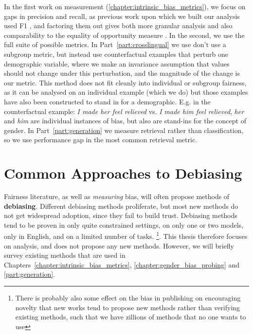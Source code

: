 In the first work on measurement (\ref{chapter:intrinsic_bias_metrics}), we focus on gaps in precision and recall, as previous work upon which we built our analysis used F1 \citep{zhao-etal-2018-gender}, and factoring them out gives both more granular analysis and also comparability to the equality of opportunity measure \citep{hardt2016equality}. In the second, we use the full suite of possible metrics. In Part~\ref{part:crosslingual} we use don't use a subgroup metric, but instead use counterfactual examples that perturb one demographic variable, where we make an invariance assumption that values should not change under this perturbation, and the magnitude of the change is our metric. This method does not fit cleanly into individual or subgroup fairness, as it can be analysed on an individual example (which we do) but those examples have also been constructed to stand in for a demographic. E.g. in the counterfactual example: \textit{I made her feel relieved} vs. \textit{I made him feel relieved}, \textit{her} and \textit{him} are individual instances of bias, but also are stand-ins for the concept of gender. In Part~\ref{part:generation} we measure retrieval rather than classification, so we use performance gap in the most common retrieval metric.  

\section{Common Approaches to Debiasing}
Fairness literature, as well as \textit{measuring} bias, will often propose methods of \textbf{debiasing}. Different debiasing methods proliferate, but most new methods do not get widespread adoption, since they fail to build trust. Debiasing methods tend to be proven in only quite constrained settings, on only one or two models, only in English, and on a limited number of tasks. \footnote{There is probably also some effect on the bias in publishing on encouraging novelty that new works tend to propose new methods rather than verifying existing methods, such that we have zillions of methods that no one wants to use}. This thesis therefore focuses on analysis, and does not propose any new methods. However, we will briefly survey existing methods that are used in Chapters~\ref{chapter:intrinsic_bias_metrics}, \ref{chapter:gender_bias_probing} and \ref{part:generation}.

